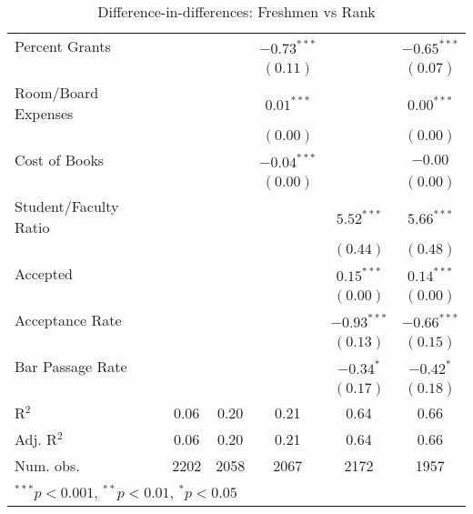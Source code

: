 \begin{table}
\begin{center}
\begin{tabular}{l c c c c c }
Percent Grants        &                &                 & $-0.73^{***}$  &                & $-0.65^{***}$ \\
                      &                &                 & $(0.11)$       &                & $(0.07)$      \\
Room/Board Expenses   &                &                 & $0.01^{***}$   &                & $0.00^{***}$  \\
                      &                &                 & $(0.00)$       &                & $(0.00)$      \\
Cost of Books         &                &                 & $-0.04^{***}$  &                & $-0.00$       \\
                      &                &                 & $(0.00)$       &                & $(0.00)$      \\
Student/Faculty Ratio &                &                 &                & $5.52^{***}$   & $5.66^{***}$  \\
                      &                &                 &                & $(0.44)$       & $(0.48)$      \\
Accepted              &                &                 &                & $0.15^{***}$   & $0.14^{***}$  \\
                      &                &                 &                & $(0.00)$       & $(0.00)$      \\
Acceptance Rate       &                &                 &                & $-0.93^{***}$  & $-0.66^{***}$ \\
                      &                &                 &                & $(0.13)$       & $(0.15)$      \\
Bar Passage Rate      &                &                 &                & $-0.34^{*}$    & $-0.42^{*}$   \\
                      &                &                 &                & $(0.17)$       & $(0.18)$      \\
\hline
R$^2$                 & 0.06           & 0.20            & 0.21           & 0.64           & 0.66          \\
Adj. R$^2$            & 0.06           & 0.20            & 0.21           & 0.64           & 0.66          \\
Num. obs.             & 2202           & 2058            & 2067           & 2172           & 1957          \\
\hline
\multicolumn{6}{l}{\scriptsize{$^{***}p<0.001$, $^{**}p<0.01$, $^*p<0.05$}}
\end{tabular}
\caption{Difference-in-differences: Freshmen vs Rank}
\label{tab:class-rank}
\end{center}
\end{table}
